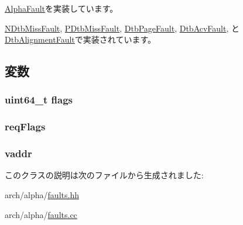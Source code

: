 \hyperlink{classAlphaISA_1_1AlphaFault_ac141ef2ab527bd4d5c079ddff2e8b4aa}{AlphaFault}を実装しています。

\hyperlink{classAlphaISA_1_1NDtbMissFault_ae15c5d7ab0162821b93d668d0b225198}{NDtbMissFault}, \hyperlink{classAlphaISA_1_1PDtbMissFault_ae15c5d7ab0162821b93d668d0b225198}{PDtbMissFault}, \hyperlink{classAlphaISA_1_1DtbPageFault_ae15c5d7ab0162821b93d668d0b225198}{DtbPageFault}, \hyperlink{classAlphaISA_1_1DtbAcvFault_ae15c5d7ab0162821b93d668d0b225198}{DtbAcvFault}, と \hyperlink{classAlphaISA_1_1DtbAlignmentFault_ae15c5d7ab0162821b93d668d0b225198}{DtbAlignmentFault}で実装されています。

\subsection{変数}
\hypertarget{classAlphaISA_1_1DtbFault_a899a76dc5f03f0d4ea3793c339e07ee9}{
\subsubsection[{flags}]{\setlength{\rightskip}{0pt plus 5cm}uint64\_\-t {\bf flags}}}
\label{classAlphaISA_1_1DtbFault_a899a76dc5f03f0d4ea3793c339e07ee9}
\hypertarget{classAlphaISA_1_1DtbFault_a4342a385c094b40ed46b0674fbb0b223}{
\subsubsection[{reqFlags}]{ {\bf reqFlags}}}
\label{classAlphaISA_1_1DtbFault_a4342a385c094b40ed46b0674fbb0b223}
\hypertarget{classAlphaISA_1_1DtbFault_a48d5190e0fd672e7fe9d248a670b8ea3}{
\subsubsection[{vaddr}]{ {\bf vaddr}}}
\label{classAlphaISA_1_1DtbFault_a48d5190e0fd672e7fe9d248a670b8ea3}


このクラスの説明は次のファイルから生成されました:\begin{DoxyCompactItemize}
\item 
arch/alpha/\hyperlink{arch_2alpha_2faults_8hh}{faults.hh}\item 
arch/alpha/\hyperlink{arch_2alpha_2faults_8cc}{faults.cc}\end{DoxyCompactItemize}
